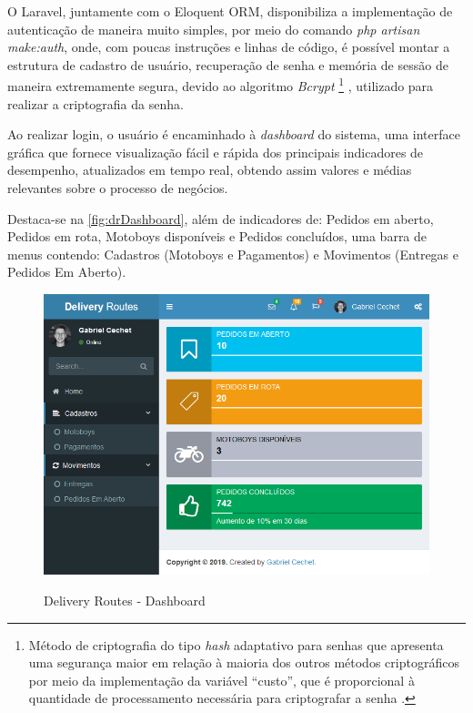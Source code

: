 O Laravel, juntamente com o Eloquent ORM, disponibiliza a implementação de autenticação de maneira muito simples, por meio do comando \textit{php artisan make:auth}, onde, com poucas instruções e linhas de código, é possível montar a estrutura de cadastro de usuário, recuperação de senha e memória de sessão de maneira extremamente segura, devido ao algoritmo \textit{Bcrypt}
\footnote{Método de criptografia do tipo \textit{hash} adaptativo para senhas que apresenta uma segurança maior em relação à maioria dos outros métodos criptográficos por meio da implementação da variável “custo”, que é proporcional à quantidade de processamento necessária para criptografar a senha \cite{bcrypt}.}
, utilizado para realizar a criptografia da senha.

Ao realizar login, o usuário é encaminhado à \textit{dashboard} do sistema, uma interface gráfica que fornece visualização fácil e rápida dos principais indicadores de desempenho, atualizados em tempo real, obtendo assim valores e médias relevantes sobre o processo de negócios. 

Destaca-se na \autoref{fig:drDashboard}, além de indicadores de: Pedidos em aberto, Pedidos em rota, Motoboys disponíveis e Pedidos concluídos, uma barra de menus contendo: Cadastros (Motoboys e Pagamentos) e Movimentos (Entregas e Pedidos Em Aberto).

\begin{figure}[H]
    \centering
    \caption{Delivery Routes - Dashboard}
    \includegraphics[width=1.0\textwidth]{./dados/figuras/fig13}
    \label{fig:drDashboard}
\end{figure}

